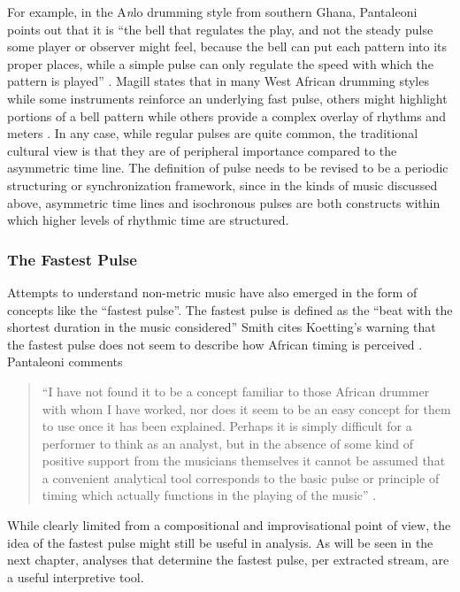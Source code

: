 For example, in the A{\it n}lo drumming style from southern Ghana, 
Pantaleoni points out that it is ``the bell that regulates the play, 
and not the steady pulse some player or observer might feel, because 
the bell can put each pattern into its proper places, while a simple
pulse can only regulate the speed with which the pattern is played''
\cite[p. 60]{Pantaleoni:72}. Magill states that in many West African 
drumming styles while some instruments reinforce an underlying fast pulse, 
others might highlight portions of a bell pattern while others provide
a complex overlay of rhythms and meters \cite[p. 190]{Magill:97}. In
any case, while regular pulses are quite common, the traditional 
cultural view is that they are of peripheral importance compared 
to the asymmetric time line. The definition of pulse needs to be 
revised to be a periodic structuring or synchronization framework, 
since in the kinds of music discussed above, asymmetric time lines 
and isochronous pulses are both constructs within which higher levels 
of rhythmic time are structured. 

\vspace{5mm}
\subsubsection{ The Fastest Pulse }

Attempts to understand non-metric music have also emerged in the form of
concepts like the ``fastest pulse''. The fastest pulse is defined as 
the ``beat with the shortest duration in the music considered''
\cite[p. 33]{Smith:99} Smith cites Koetting's warning that the fastest
pulse does not seem to describe how African timing is perceived
\cite[p. 33]{Smith:99}.  Pantaleoni comments \begin{quote} ``I have
not found it to be a concept familiar to those African drummer with 
whom I have worked, nor does it seem to be an easy concept for them to
use once it has been explained. Perhaps it is simply difficult for a 
performer to think as an analyst, but in the absence of some kind of 
positive support from the musicians themselves it cannot be assumed 
that a convenient analytical tool corresponds to the basic pulse or 
principle of timing which actually functions in the playing of the 
music'' \cite[p. 58]{Pantaleoni:72}. \end{quote}
While clearly limited from a compositional and improvisational point 
of view, the idea of the fastest pulse might still be useful in
analysis. As will be seen in the next chapter, analyses that determine
the fastest pulse, per extracted stream, are a useful interpretive tool.

